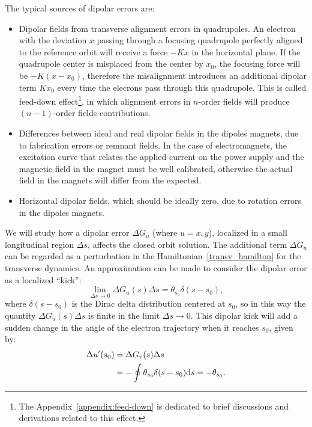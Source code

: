 The typical sources of dipolar errors are:
\begin{itemize}
    \item Dipolar fields from transverse alignment errors in quadrupoles. An electron with the deviation $x$ passing through a focusing quadrupole perfectly aligned to the reference orbit will receive a force $-Kx$ in the horizontal plane. If the quadrupole center is misplaced from the center by $x_0$, the focusing force will be $-K(x - x_0)$, therefore the misalignment introduces an additional dipolar term $K x_0$ every time the elecrons pass through this quadrupole. This is called feed-down effect\footnote{The Appendix~\ref{appendix:feed-down} is dedicated to brief discussions and derivations related to this effect.}, in which alignment errors in $n$-order fields will produce $(n-1)$-order fields contributions.
    \item Differences between ideal and real dipolar fields in the dipoles magnets, due to fabrication errors or remnant fields. In the case of electromagnets, the excitation curve that relates the applied current on the power supply and the magnetic field in the magnet must be well calibrated, otherwise the actual field in the magnets will differ from the expected. 
    \item Horizontal dipolar fields, which should be ideally zero, due to rotation errors in the dipoles magnets.
\end{itemize}
We will study how a dipolar error $\Delta G_u$ (where $u=x, y$), localized in a small longitudinal region $\Delta s$, affects the closed orbit solution. The additional term $\Delta G_u$ can be regarded as a perturbation in the Hamiltonian~\eqref{transv_hamilton} for the transverse dynamics. An approximation can be made to consider the dipolar error as a localized ``kick'': 
\begin{equation*}
    \lim_{\Delta s \rightarrow 0}\Delta G_u(s)\Delta s = \theta_{s_0} \delta(s - s_0),
\end{equation*}
where $\delta(s-s_0)$ is the Dirac delta distribution centered at $s_0$, so in this way the quantity $\Delta G_u(s)\Delta s$ is finite in the limit $\Delta s \rightarrow 0$. This dipolar kick will add a sudden change in the angle of the electron trajectory when it reaches $s_0$, given by:
\begin{align*}
    \Delta u'(s_0) &= \Delta G_v(s) \Delta s \\
    &= -\oint \theta_{s_0} \delta(s - s_0) \mathrm{d} s = -\theta_{s_0}.
\end{align*}

